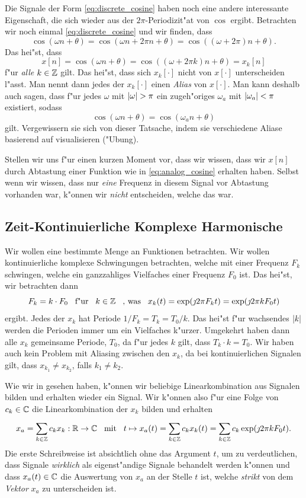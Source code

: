 Die Signale der Form \eqref{eq:discrete_cosine} haben noch eine andere interessante Eigenschaft, die sich wieder aus der $2\pi$-Periodizit"at von $\cos$ ergibt. 
Betrachten wir noch einmal \eqref{eq:discrete_cosine} und wir finden, dass
\[
\cos(\omega n + \theta) = \cos(\omega n + 2\pi n + \theta) = \cos((\omega + 2\pi) n + \theta).
\]
Das hei"st, dass
\[
    x[n] = \cos(\omega n + \theta) = \cos((\omega + 2\pi k) n + \theta) = x_k[n]
\]
f"ur \emph{alle} $k \in \mathbb{Z}$ gilt.
Das hei"st, dass sich $x_k[\cdot]$ nicht von $x[\cdot]$ unterscheiden l"asst.
Man nennt dann jedes der $x_k[\cdot]$ einen \emph{Alias} von $x[\cdot]$.
Man kann deshalb auch sagen, dass f"ur jedes $\omega$ mit ${\left| \omega \right|} > \pi$ ein zugeh"origes $\omega_a$ mit ${\left| \omega_a \right|} < \pi$ existiert, sodass
\[
    \cos(\omega n + \theta) = \cos(\omega_a n + \theta)
\]
gilt.
Vergewissern sie sich von dieser Tatsache, indem sie verschiedene Aliase basierend auf  visualisieren ("Ubung).

Stellen wir uns f"ur einen kurzen Moment vor, dass wir wissen, dass wir $x[n]$ durch Abtastung einer Funktion wie in \eqref{eq:analog_cosine} erhalten haben.
Selbst wenn wir wissen, dass nur \emph{eine} Frequenz in diesem Signal vor Abtastung vorhanden war, k"onnen wir \emph{nicht} entscheiden, welche das war.
%
\FloatBarrier
%
\subsection{Zeit-Kontinuierliche Komplexe Harmonische}\label{sec:cont_complex_harm}
%
Wir wollen eine bestimmte Menge an Funktionen betrachten. Wir wollen kontinuierliche komplexe Schwingungen betrachten, welche mit einer Frequenz $F_k$ schwingen, welche ein ganzzahliges Vielfaches einer Frequenz $F_0$ ist.
Das hei"st, wir betrachten dann
\[
F_k = k \cdot F_0 {\hspace{3mm} \text{f"ur} \hspace{3mm}} k \in \mathbb{Z} {\hspace{3mm} \text{, was} \hspace{3mm}}
x_k(t) = \exp(\jmath 2 \pi F_k t) = \exp(\jmath 2 \pi k F_0 t)
\]
ergibt. 
Jedes der $x_k$ hat Periode $1/F_k = T_k = T_0/k$. 
Das hei"st f"ur wachsendes ${\left| k \right|}$ werden die Perioden immer um ein Vielfaches k"urzer. 
Umgekehrt haben dann alle $x_k$ gemeinsame Periode, $T_0$, da f"ur jedes $k$ gilt, dass $T_k \cdot k = T_0$.
Wir haben auch kein Problem mit Aliasing zwischen den $x_k$, da bei kontinuierlichen Signalen gilt, dass $x_{k_1} \neq x_{k_2}$, falls $k_1 \neq k_2$.

Wie wir in  gesehen haben, k"onnen wir beliebige Linearkombination aus Signalen bilden und erhalten wieder ein Signal.
Wir k"onnen also f"ur eine Folge von $c_k \in \mathbb{C}$ die Linearkombination der $x_k$ bilden und erhalten
%
\begin{equation}\label{eq:cont_fourier_series}
    x_a = {\sum\limits_{k \in \mathbb{Z}}^{}{c_k x_k}} : \mathbb{R} \rightarrow \mathbb{C}
    {\hspace{3mm} \text{mit} \hspace{3mm}} 
    t \mapsto x_a(t) = {\sum\limits_{k \in \mathbb{Z}}^{}{c_k x_k(t)}}
        = {\sum\limits_{k \in \mathbb{Z}}^{}{c_k \exp(\jmath 2 \pi k F_0 t)}}.
\end{equation}
%
Die erste Schreibweise ist absichtlich ohne das Argument $t$, um zu verdeutlichen, dass Signale \emph{wirklich} als eigenst"andige Signale behandelt werden k"onnen und dass $x_a(t) \in \mathbb{C}$  die Auswertung von $x_a$ an der Stelle $t$ ist, welche \emph{strikt} von dem \emph{Vektor} $x_a$ zu unterscheiden ist.

